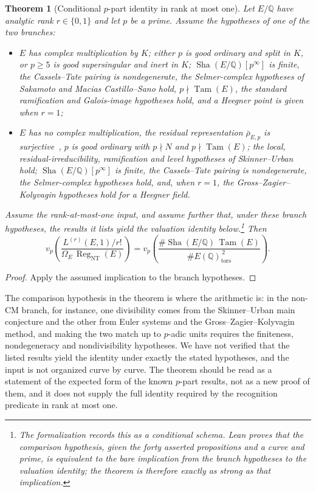 \documentclass[11pt]{article}
\newtheorem{theorem}{Theorem}[section]
\theoremstyle{definition}
\newcommand{\Q}{\mathbb{Q}}
\newcommand{\Sha}{\operatorname{Sha}}
\newcommand{\Reg}{\operatorname{Reg}}
\newcommand{\Tam}{\operatorname{Tam}}
\newcommand{\tors}{\operatorname{tors}}
\begin{document}
\begin{theorem}[Conditional $p$-part identity in rank at most one]\label{thm:closure:t-cascade-rank-le-1}
Let $E/\Q$ have analytic rank $r\in\{0,1\}$ and let $p$ be a prime.
Assume the hypotheses of one of the two branches:
\begin{itemize}
\item[(CM)] $E$ has complex multiplication by $K$; either $p$ is good
  ordinary and split in $K$, or $p\ge5$ is good supersingular and inert in
  $K$; $\Sha(E/\Q)[p^\infty]$ is finite, the Cassels--Tate pairing is
  nondegenerate, the Selmer-complex hypotheses of Sakamoto and Macias
  Castillo--Sano hold, $p\nmid\Tam(E)$, the standard ramification and
  Galois-image hypotheses hold, and a Heegner point is given when $r=1$;
\item[(non-CM)] $E$ has no complex multiplication, the residual
  representation $\bar\rho_{E,p}$ is surjective~\citep{Serre1972}, $p$ is
  good ordinary with $p\nmid N$ and $p\nmid\Tam(E)$; the local,
  residual-irreducibility, ramification and level hypotheses of
  Skinner--Urban hold; $\Sha(E/\Q)[p^\infty]$ is finite, the Cassels--Tate
  pairing is nondegenerate, the Selmer-complex hypotheses hold, and, when
  $r=1$, the Gross--Zagier--Kolyvagin hypotheses hold for a Heegner field.
\end{itemize}
Assume the rank-at-most-one input, and assume further that, under these
branch hypotheses, the results it lists yield the valuation identity
below.\footnote{The formalization records this as a conditional schema.  Lean
proves that the comparison hypothesis, given the forty asserted
propositions and a curve and prime, is equivalent to the bare implication
from the branch hypotheses to the valuation identity; the theorem is
therefore exactly as strong as that implication.}  Then
\[
  v_p\!\left(\frac{L^{(r)}(E,1)/r!}{\Omega_E\,\Reg_{\mathrm{NT}}(E)}\right)
  =
  v_p\!\left(\frac{\#\Sha(E/\Q)\,\Tam(E)}{\#E(\Q)_{\tors}^{\,2}}\right).
\]
\end{theorem}

\begin{proof}
Apply the assumed implication to the branch hypotheses.
\end{proof}

The comparison hypothesis in the theorem is where the arithmetic is: in
the non-CM branch, for instance, one divisibility comes from the
Skinner--Urban main conjecture and the other from Euler systems and the
Gross--Zagier--Kolyvagin method, and making the two match up to $p$-adic
units requires the finiteness, nondegeneracy and nondivisibility
hypotheses.  We have not verified that the listed results yield the
identity under exactly the stated hypotheses, and the input is not
organized curve by curve.  The theorem should be read as a statement of
the expected form of the known $p$-part results, not as a new proof of
them, and it does not supply the full identity required by the
recognition predicate in rank at most one.
\end{document}
